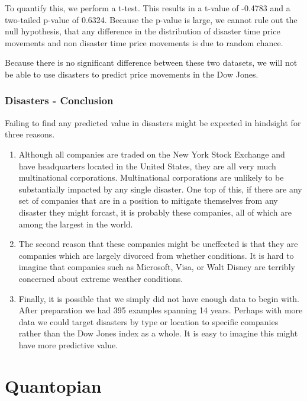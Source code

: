 \documentclass{report}
\begin{document}
To quantify this, we perform a t-test. This results in a t-value of -0.4783 and a two-tailed p-value of 0.6324. Because the p-value is large, we cannot rule out the null hypothesis, that any difference in the distribution of disaster time price movements and non disaster time price movements is due to random chance.

Because there is no significant difference between these two datasets, we will not be able to use disasters to predict price movements in the Dow Jones.

\subsection{Disasters - Conclusion}

Failing to find any predicted value in disasters might be expected in hindsight for three reasons.

\begin{enumerate}
  \item Although all companies are traded on the New York Stock Exchange and have headquarters located in the United States, they are all very much multinational corporations. Multinational corporations are unlikely to be substantially impacted by any single disaster. One top of this, if there are any set of companies that are in a position to mitigate themselves from any disaster they might forcast, it is probably these companies, all of which are among the largest in the world.
  
  \item The second reason that these companies might be uneffected is that they are companies which are largely divorced from whether conditions. It is hard to imagine that companies such as Microsoft, Visa, or Walt Disney are terribly concerned about extreme weather conditions.
  
  \item Finally, it is possible that we simply did not have enough data to begin with. After preparation we had 395 examples spanning 14 years. Perhaps with more data we could target disasters by type or location to specific companies rather than the Dow Jones index as a whole. It is easy to imagine this might have more predictive value.
  
\end{enumerate}

\chapter{Quantopian}
\end{document}
